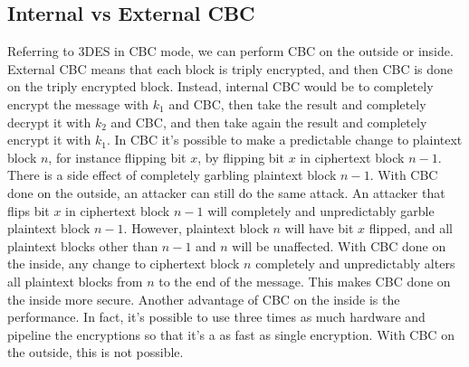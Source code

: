 \documentclass[11pt]{article}
\begin{document}
\subsection{Internal vs External CBC}
Referring to 3DES in CBC mode, we can perform CBC on the outside or inside. External CBC means that each block is triply encrypted, and then CBC is done on the triply encrypted block. Instead, internal CBC would be to completely encrypt the message with $k_1$ and CBC, then take the result and completely decrypt it with $k_2$ and CBC, and then take again the result and completely encrypt it with $k_1$. In CBC it's possible to make a predictable change to plaintext block $n$, for instance flipping bit $x$, by flipping bit $x$ in ciphertext block $n - 1$. There is a side effect of completely garbling plaintext block $n - 1$. With CBC done on the outside, an attacker can still do the same attack. An attacker that flips bit $x$ in ciphertext block $n - 1$ will completely and unpredictably garble plaintext block $n - 1$. However, plaintext block $n$ will have bit $x$ flipped, and all plaintext blocks other than $n - 1$ and $n$ will be unaffected. With CBC done on the inside, any change to ciphertext block $n$ completely and unpredictably alters all plaintext blocks from $n$ to the end of the message. This makes CBC done on the inside more secure. Another advantage of CBC on the inside is the performance. In fact, it's possible to use three times as much hardware and pipeline the encryptions so that it's a as fast as single encryption. With CBC on the outside, this is not possible.
\end{document}
